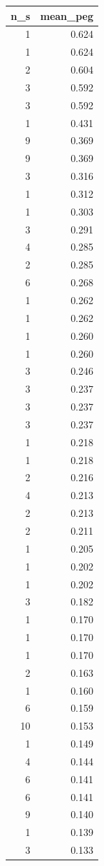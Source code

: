 \begin{tabular}{rr}
\toprule
n_s & mean_peg \\
\midrule
1 & 0.624 \\
1 & 0.624 \\
2 & 0.604 \\
3 & 0.592 \\
3 & 0.592 \\
1 & 0.431 \\
9 & 0.369 \\
9 & 0.369 \\
3 & 0.316 \\
1 & 0.312 \\
1 & 0.303 \\
3 & 0.291 \\
4 & 0.285 \\
2 & 0.285 \\
6 & 0.268 \\
1 & 0.262 \\
1 & 0.262 \\
1 & 0.260 \\
1 & 0.260 \\
3 & 0.246 \\
3 & 0.237 \\
3 & 0.237 \\
3 & 0.237 \\
1 & 0.218 \\
1 & 0.218 \\
2 & 0.216 \\
4 & 0.213 \\
2 & 0.213 \\
2 & 0.211 \\
1 & 0.205 \\
1 & 0.202 \\
1 & 0.202 \\
3 & 0.182 \\
1 & 0.170 \\
1 & 0.170 \\
1 & 0.170 \\
2 & 0.163 \\
1 & 0.160 \\
6 & 0.159 \\
10 & 0.153 \\
1 & 0.149 \\
4 & 0.144 \\
6 & 0.141 \\
6 & 0.141 \\
9 & 0.140 \\
1 & 0.139 \\
3 & 0.133 \\

\end{tabular}
